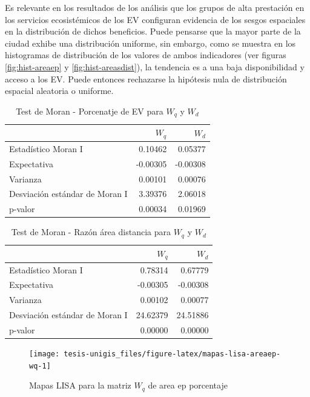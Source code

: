 \documentclass[12pt,a4paper,openany]{book}
\theoremstyle{definition}
\theoremstyle{definition}
\theoremstyle{definition}
\theoremstyle{remark}
\begin{document}
Es relevante en los resultados de los análisis que los grupos de alta
prestación en los servicios ecosistémicos de los EV configuran evidencia
de los sesgos espaciales en la distribución de dichos beneficios. Puede
pensarse que la mayor parte de la ciudad exhibe una distribución
uniforme, sin embargo, como se muestra en los histogramas de
distribución de los valores de ambos indicadores (ver figuras
\ref{fig:hist-areaep} y \ref{fig:hist-areasdist}), la tendencia es a una
baja disponibilidad y acceso a los EV. Puede entonces rechazarse la
hipótesis nula de distribución espacial aleatoria o uniforme.

\begin{table}[t]

\caption{\label{tab:moran-areaep-w}Test de Moran - Porcenatje de EV para $W_q$ y $W_d$}
\centering
\begin{tabular}{lrr}
\toprule
  & $W_q$ & $W_d$\\
\midrule
Estadístico Moran I & 0.10462 & 0.05377\\
Expectativa & -0.00305 & -0.00308\\
Varianza & 0.00101 & 0.00076\\
Desviación estándar de Moran I & 3.39376 & 2.06018\\
p-valor & 0.00034 & 0.01969\\
\bottomrule
\end{tabular}
\end{table}

\begin{table}[t]

\caption{\label{tab:moran-areadist-w}Test de Moran - Razón área distancia para $W_{q}$ y $W_{d}$}
\centering
\begin{tabular}{lrr}
\toprule
  & $W_{q}$ & $W_{d}$\\
\midrule
Estadístico Moran I & 0.78314 & 0.67779\\
Expectativa & -0.00305 & -0.00308\\
Varianza & 0.00102 & 0.00077\\
Desviación estándar de Moran I & 24.62379 & 24.51886\\
p-valor & 0.00000 & 0.00000\\
\bottomrule
\end{tabular}
\end{table}

\begin{figure}

{\centering \texttt{[image: tesis-unigis\_files/figure-latex/mapas-lisa-areaep-wq-1]} 

}

\caption{Mapas LISA para la matriz $W_q$ de area ep porcentaje }\label{fig:mapas-lisa-areaep-wq}
\end{figure}
\end{document}

